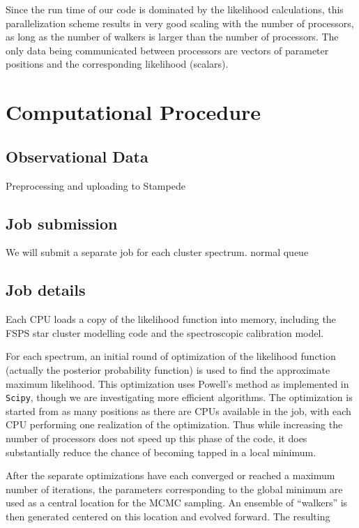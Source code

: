 \documentclass[11pt,preprint]{aastex}
\begin{document}
Since the run time of our code is dominated by the likelihood
calculations, this parallelization scheme results in very good scaling
with the number of processors, as long as the number of walkers is
larger than the number of processors.  The only data being
communicated between processors are vectors of parameter positions and
the corresponding likelihood (scalars).


\section{Computational Procedure}

\subsection{Observational Data}
Preprocessing and uploading to Stampede

\subsection{Job submission}
We will submit a separate job for each cluster spectrum. normal queue

\subsection{Job details}
Each CPU loads a copy of the likelihood function into memory,
including the FSPS star cluster modelling code and the spectroscopic
calibration model.

For each spectrum, an initial round of optimization of the likelihood
function (actually the posterior probability function) is used to find
the approximate maximum likelihood. This optimization uses Powell's
method as implemented in \texttt{Scipy}, though we are investigating
more efficient algorithms. The optimization is started from as many
positions as there are CPUs available in the job, with each CPU
performing one realization of the optimization.  Thus while increasing
the number of processors does not speed up this phase of the code, it
does substantially reduce the chance of becoming tapped in a local
minimum.

After the separate optimizations have each converged or reached a
maximum number of iterations, the parameters corresponding to the
global minimum are used as a central location for the MCMC sampling.
An ensemble of ``walkers'' is then generated centered on this location
and evolved forward.  The resulting 
\end{document}
